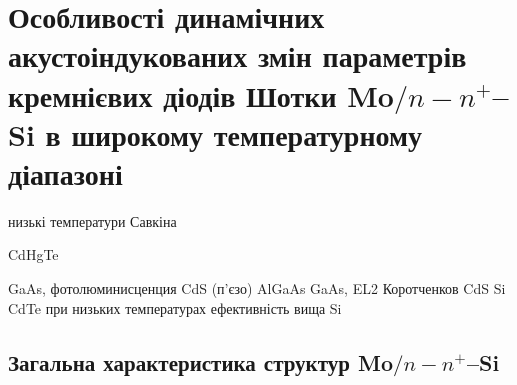\documentclass[a4paper,14pt,oneside,openany]{memoir}
\begin{document}







%










%

\chapter{Особливості динамічних акустоіндукованих змін параметрів
кремнієвих діодів Шотки Mo$/n-n^+$--Si в широкому температурному діапазоні\label{Ch_USL_T_SD}}

низькі температури Савкіна \cite{Savkina:FM2003,Savkina:SPQEO2013,Savkina:PJTF2015,Savkina:PSSc2015,Savkina2015,Savkina:JPD2010,kryshtab_savkina_smirnov_2013}


CdHgTe\cite{Vlasenko2000r,SavkinaPSSB2002}

GaAs, фотолюминисценция\cite{Zhuravlev}
CdS (п'єзо) \cite{BorkovFTT,sheinkman1995}
AlGaAs \cite{belyaev1994}
GaAs, EL2 \cite{buyanova1994,Ostapenko1994}
Коротченков CdS \cite{KorotchenAPL1998,KOROTCHENKOV1998} Si\cite{Korotchenkov1995,KorotchFTP1996}
CdTe при низьких температурах ефективність вища\cite{YOlikh:UFG2016,YOlikh:SupMicr}
Si\cite{YOlikhTPL2011r}


\section{Загальна характеристика структур Mo$/n-n^+$--Si\label{SSDB:Struc}}
\end{document}
